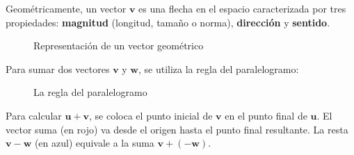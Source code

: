 \begin{definition}\label{defvectoresgeometrica}
 
Geométricamente, un vector $\mathbf{v}$ es una flecha en el espacio caracterizada por tres propiedades: \textbf{magnitud} (longitud, tamaño o norma), \textbf{dirección} y \textbf{sentido}.

\begin{figure}[!htbp]
\centering
{}
\caption{Representación de un vector geométrico}
\label{fig:vector_geometrico}
\end{figure}

Para sumar dos vectores $\mathbf{v}$ y $\mathbf{w}$, se utiliza la regla del paralelogramo:
 
\begin{figure}[!htbp]
\centering
{}
\caption{La regla del paralelogramo}
\label{fig:regla_paralelogramo}
\end{figure}

Para calcular $\mathbf{u}+\mathbf{v}$, se coloca el punto inicial de $\mathbf{v}$ en el punto final de $\mathbf{u}$. El vector suma (en rojo) va desde el origen hasta el punto final resultante. La resta $\mathbf{v}-\mathbf{w}$ (en azul) equivale a la suma $\mathbf{v}+(-\mathbf{w})$.
\end{definition}

